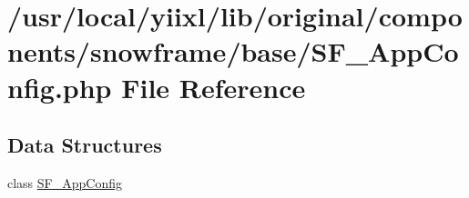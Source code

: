 \hypertarget{SF__AppConfig_8php}{
\section{/usr/local/yiixl/lib/original/components/snowframe/base/SF\_\-AppConfig.php File Reference}
\label{SF__AppConfig_8php}
}
\subsection*{Data Structures}
\begin{DoxyCompactItemize}
\item 
class \hyperlink{classSF__AppConfig}{SF\_\-AppConfig}
\end{DoxyCompactItemize}
